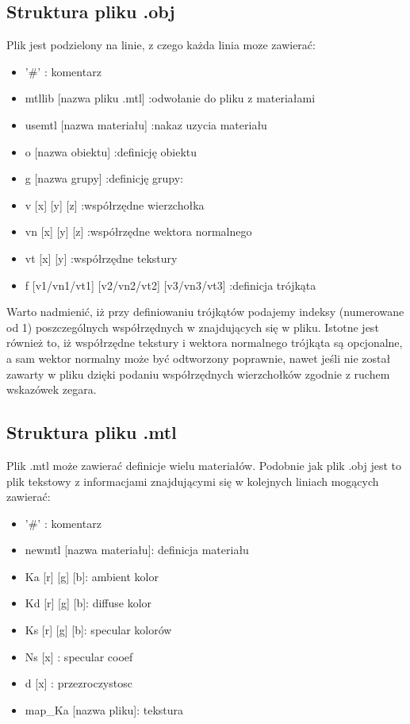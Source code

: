 \subsection{Struktura pliku .obj}
Plik jest podzielony na linie, z czego każda linia moze zawierać:
\begin{itemize}
\item '\#' : komentarz 
\item mtllib [nazwa pliku .mtl] :odwołanie do pliku z materiałami
\item usemtl [nazwa materiału]  :nakaz uzycia materiału
\item o [nazwa obiektu]         :definicję obiektu
\item g [nazwa grupy]           :definicję grupy: 
\item v [x] [y] [z]             :współrzędne wierzchołka
\item vn [x] [y] [z]            :współrzędne wektora normalnego
\item vt [x] [y]                :współrzędne tekstury
\item f [v1/vn1/vt1] [v2/vn2/vt2] [v3/vn3/vt3] :definicja trójkąta 
\end{itemize}
Warto nadmienić, iż przy definiowaniu trójkątów podajemy indeksy (numerowane od 1) poszczególnych współrzędnych w znajdujących się w pliku.
Istotne jest również to, iż współrzędne tekstury i wektora normalnego trójkąta są opcjonalne, a sam wektor normalny może być odtworzony poprawnie,
nawet jeśli nie został zawarty w pliku dzięki podaniu współrzędnych wierzchołków zgodnie z ruchem wskazówek zegara.


\subsection{Struktura pliku .mtl}
Plik .mtl może zawierać definicje wielu materiałów. Podobnie jak plik .obj jest to plik tekstowy z informacjami znajdującymi
się w kolejnych liniach mogących zawierać:
\begin{itemize}
\item '\#' : komentarz 
\item newmtl [nazwa materiału]: definicja materiału
\item Ka [r] [g] [b]: ambient kolor
\item Kd [r] [g] [b]: diffuse kolor
\item Ks [r] [g] [b]: specular kolorów
\item Ns [x]        : specular cooef
\item d  [x]        : przezroczystosc
\item map\_Ka [nazwa pliku]: tekstura 
\end{itemize}


